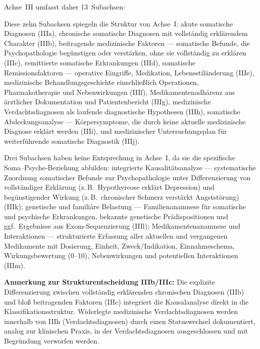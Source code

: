 \documentclass[11pt,a4paper]{article}
\begin{document}
Achse~III umfasst daher 13~Subachsen:

\begin{description}[style=nextline, leftmargin=1.5cm, font=\bfseries]
\item[IIIa--IIIj: Parallele Kernstruktur] Diese zehn Subachsen spiegeln die Struktur von Achse~I: akute somatische Diagnosen (IIIa), chronische somatische Diagnosen mit vollst\"andig erkl\"arendem Charakter (IIIb), beitragende medizinische Faktoren --- somatische Befunde, die Psychopathologie beg\"unstigen oder verst\"arken, ohne sie vollst\"andig zu erkl\"aren (IIIc), remittierte somatische Erkrankungen (IIId), somatische Remissionsfaktoren --- operative Eingriffe, Medikation, Lebensstil\"anderung (IIIe), medizinische Behandlungsgeschichte einschlie\ss{}lich Operationen, Pharmakotherapie und Nebenwirkungen (IIIf), Medikamentenadhärenz aus \"arztlicher Dokumentation und Patientenbericht (IIIg), medizinische Verdachtsdiagnosen als laufende diagnostische Hypothesen (IIIh), somatische Abdeckungsanalyse --- K\"orpersymptome, die durch keine aktuelle medizinische Diagnose erkl\"art werden (IIIi), und medizinischer Untersuchungsplan f\"ur weiterf\"uhrende somatische Diagnostik (IIIj).
\item[IIIk--IIIm: Achse-III-spezifische Subachsen] Drei Subachsen haben keine Entsprechung in Achse~I, da sie die spezifische Soma--Psyche-Beziehung abbilden: integrierte Kausalit\"atsanalyse --- systematische Zuordnung somatischer Befunde zur Psychopathologie unter Differenzierung von vollst\"andiger Erkl\"arung (z.\,B.\ Hypothyreose erkl\"art Depression) und beg\"unstigender Wirkung (z.\,B.\ chronischer Schmerz verst\"arkt Angstst\"orung) (IIIk); genetische und famili\"are Belastung --- Familienanamnese f\"ur somatische und psychische Erkrankungen, bekannte genetische Pr\"adispositionen und ggf.\ Ergebnisse aus Exom-Sequenzierung (IIIl); Medikamentenanamnese und Interaktionen --- strukturierte Erfassung aller aktuellen und vergangenen Medikamente mit Dosierung, Einheit, Zweck/Indikation, Einnahmeschema, Wirkungsbewertung (0--10), Nebenwirkungen und potentiellen Interaktionen (IIIm).
\end{description}

\textbf{Anmerkung zur Strukturentscheidung IIIb/IIIc:} Die explizite Differenzierung zwischen vollst\"andig erkl\"arenden chronischen Diagnosen (IIIb) und blo\ss{} beitragenden Faktoren (IIIc) integriert die Kausalanalyse direkt in die Klassifikationsstruktur. Widerlegte medizinische Verdachtsdiagnosen werden innerhalb von IIIh (Verdachtsdiagnosen) durch einen Statuswechsel dokumentiert, analog zur klinischen Praxis, in der Verdachtsdiagnosen ausgeschlossen und mit Begr\"undung verworfen werden.
\end{document}
